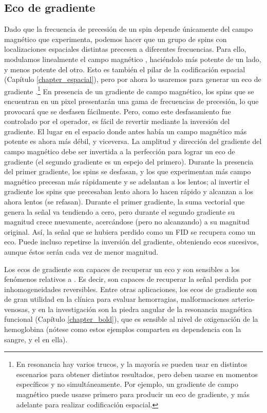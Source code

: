 \subsection{Eco de gradiente}
Dado que la frecuencia de precesión de un spin depende únicamente del campo magnético que experimenta, podemos hacer que un grupo de spins con localizaciones espaciales distintas precesen a diferentes frecuencias. Para ello, modulamos linealmente el campo magnético \Bzero, haciéndolo más potente de un lado, y menos potente del otro. Esto es también el pilar de la codificación espacial (Capítulo \ref{chapter_espacial}), pero por ahora lo usaremos para generar un eco de gradiente .\footnote{En resonancia hay varios trucos, y la mayoría se pueden usar en distintos escenarios para obtener distintos resultados, pero deben usarse en momentos específicos y no simultáneamente. Por ejemplo, un gradiente de campo magnético puede usarse primero para producir un eco de gradiente, y más adelante para realizar codificación espacial.} En presencia de un gradiente de campo magnético, los spins que se encuentran en un pixel presentarán una gama de frecuencias de precesión, lo que provocará que se desfasen fácilmente. Pero, como este desfasamiento fue controlado por el operador, es fácil de revertir mediante la inversión del gradiente. El lugar en el espacio donde antes había un campo magnético más potente es ahora más débil, y viceversa. La amplitud y dirección del gradiente del campo magnético debe ser invertida a la perfección para lograr un eco de gradiente (el segundo gradiente es un espejo del primero). Durante la presencia del primer gradiente, los spins se desfasan, y los que experimentan más campo magnético precesan más rápidamente y se adelantan a los lentos; al invertir el gradiente los spins que precesaban lento ahora lo hacen rápido y alcanzan a los ahora lentos (se refasan). Durante el primer gradiente, la suma vectorial que genera la señal va tendiendo a cero, pero durante el segundo gradiente su magnitud crece nuevamente, acercándose (pero no alcanzando) a su magnitud original. Así, la señal que se hubiera perdido como un FID se recupera como un eco. Puede incluso repetirse la inversión del gradiente, obteniendo ecos sucesivos, aunque éstos serán cada vez de menor magnitud. 

Los ecos de gradiente son capaces de recuperar un eco y son sensibles a los fenómenos relativos a \Ttwostar. Es decir, son capaces de recuperar la señal perdida por inhomogeneidades reversibles. Entre otras aplicaciones, los ecos de gradiente son de gran utilidad en la clínica para evaluar hemorragias, malformaciones arterio-venosas, y en la investigación son la piedra angular de la resonancia magnética funcional (Capítulo \ref{chapter_bold}), que es sensible al nivel de oxigenación de la hemoglobina (nótese como estos ejemplos comparten su dependencia con la sangre, y el  en ella).

